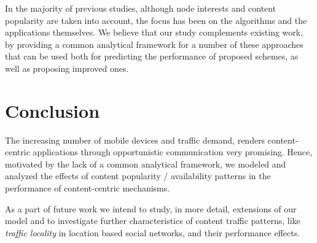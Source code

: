 \documentclass[journal]{IEEEtran}
\begin{document}
In the majority of previous studies, although node interests and content popularity are taken into account, the focus has been on the algorithms and the applications themselves. We believe that our study complements existing work, by providing a common analytical framework for a number of these approaches that can be used both for predicting the performance of proposed schemes, as well as proposing improved ones.










\section{Conclusion}\label{sec:conclusion}
The increasing number of mobile devices and traffic demand, renders content-centric applications through opportunistic communication very promising. Hence, motivated by the lack of a common analytical framework, we modeled and analyzed the effects of content popularity / availability patterns in the performance of content-centric mechanisms.

As a part of future work we intend to study, in more detail, extensions of our model and to investigate further characteristics of content traffic patterns, like \textit{traffic locality} in location based social networks, and their performance effects.







\ifCLASSOPTIONcaptionsoff
  \newpage
\fi
\end{document}
